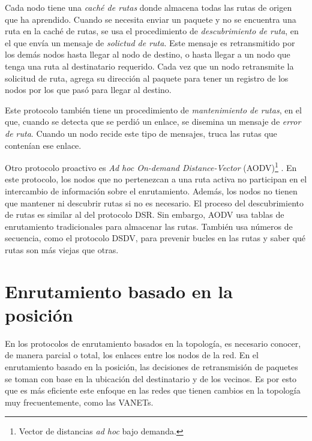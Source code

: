 Cada nodo tiene una \textit{caché de rutas} donde almacena todas las rutas de
origen que ha aprendido. Cuando se necesita enviar un paquete y no se encuentra
una ruta en la caché de rutas, se usa el procedimiento de \textit{descubrimiento
de ruta}, en el que envía un mensaje de \textit{solictud de ruta}. Este mensaje
es retransmitido por los demás nodos hasta llegar al nodo de destino, o hasta
llegar a un nodo que tenga una ruta al destinatario requerido. Cada vez que un
nodo retransmite la solicitud de ruta, agrega su dirección al paquete para
tener un registro de los nodos por los que pasó para llegar al destino.

Este protocolo también tiene un procedimiento de \textit{mantenimiento de
rutas}, en el que, cuando se detecta que se perdió un enlace, se disemina un
mensaje de \textit{error de ruta}. Cuando un nodo recide este tipo de mensajes,
truca las rutas que contenían ese enlace.

Otro protocolo proactivo es \textit{Ad hoc On-demand Distance-Vector}
(AODV)\footnote{Vector de distancias \textit{ad hoc} bajo demanda.}
\cite{Perkins1999}. En este protocolo, los nodos que no pertenezcan a una ruta
activa no participan en el intercambio de información sobre el enrutamiento.
Además, los nodos no tienen que mantener ni descubrir rutas si no es necesario.
El proceso del descubrimiento de rutas es similar al del protocolo DSR. Sin
embargo, AODV usa tablas de enrutamiento tradicionales para almacenar las
rutas. También usa números de secuencia, como el protocolo DSDV, para prevenir
bucles en las rutas y saber qué rutas son más viejas que otras.

\section{Enrutamiento basado en la posición}

\label{sec:enrutamiento_basado_en_la_posicion}

En los protocolos de enrutamiento basados en la topología, es necesario
conocer, de manera parcial o total, los enlaces entre los nodos de la red. En
el enrutamiento basado en la posición, las decisiones de retransmisión de
paquetes se toman con base en la ubicación del destinatario y de los vecinos.
Es por esto que es más eficiente este enfoque en las redes que tienen cambios en
la topología muy frecuentemente, como las VANETs. \cite{Wenden2005}

